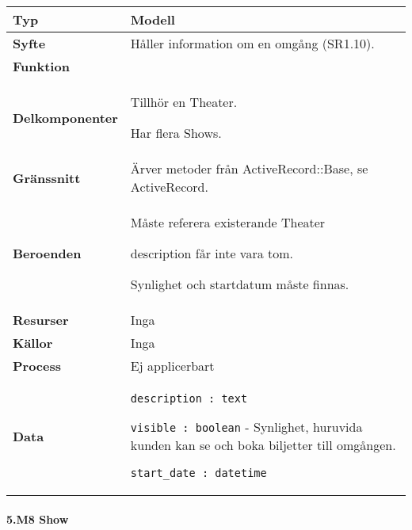 \documentclass[a4paper, twoside, 11pt, titlepage]{article}
\begin{document}
			\begin {table} [ht] \begin{tabular} {  p{3.5cm} p{11.6cm} }
				\hline
				{\sffamily\textbf{Typ}} & {Modell} \\
				\hline
				{\sffamily\textbf{Syfte}} & {Håller information om en omgång (SR1.10).} \\
				\hline
				{\sffamily\textbf{Funktion}} & { } \\
				\hline
				{\sffamily\textbf{Delkomponenter}} & {Tillhör en Theater.

Har flera Shows.} \\
				\hline
				{\sffamily\textbf{Gränssnitt}} & {Ärver metoder från ActiveRecord::Base, se ActiveRecord.} \\
				\hline
				{\sffamily\textbf{Beroenden}} & {Måste referera existerande Theater

description får inte vara tom.

Synlighet och startdatum måste finnas.} \\
				\hline
				{\sffamily\textbf{Resurser}} & {Inga} \\
				\hline
				{\sffamily\textbf{Källor}} & {Inga} \\
				\hline
				{\sffamily\textbf{Process}} & {Ej applicerbart} \\
				\hline
				{\sffamily\textbf{Data}} & {{\tt description : text}

{\tt visible : boolean} - Synlighet, huruvida kunden kan se och boka biljetter till omgången.

{\tt start\_date : datetime}} \\
				\hline
			\end{tabular} \end{table} \FloatBarrier


			\clearpage %
			\paragraph{5.M8 Show}\
\end{document}
